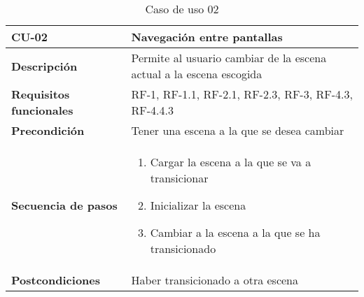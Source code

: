 \begin{longtable}{l|l}
\caption{Caso de uso 02}\\
\begin{minipage}{0.25\columnwidth}
\textbf{CU-02} 
\end{minipage}
&
\begin{minipage}{0.65\columnwidth}
Navegación entre pantallas
\end{minipage}
\\ \hline

\begin{minipage}{0.25\columnwidth}
\textbf{Descripción} 
\end{minipage}
&
\begin{minipage}{0.65\columnwidth}
Permite al usuario cambiar de la escena actual a la escena escogida
\end{minipage}
\\ \hline

\begin{minipage}{0.25\columnwidth}
\textbf{Requisitos funcionales} 
\end{minipage}
&
\begin{minipage}{0.65\columnwidth}
RF-1, RF-1.1, RF-2.1, RF-2.3, RF-3, RF-4.3, RF-4.4.3
\end{minipage}
\\ \hline

\begin{minipage}{0.25\columnwidth}
\textbf{Precondición} 
\end{minipage}
&
\begin{minipage}{0.65\columnwidth}
Tener una escena a la que se desea cambiar
\end{minipage}
\\ \hline

\begin{minipage}{0.25\columnwidth}
\textbf{Secuencia de pasos} 
\end{minipage}
&
\begin{minipage}{0.65\columnwidth}
\begin{enumerate}
\item
Cargar la escena a la que se va a transicionar
\item
Inicializar la escena
\item
Cambiar a la escena a la que se ha transicionado
\end{enumerate}
\end{minipage}
\\ \hline

\begin{minipage}{0.25\columnwidth}
\textbf{Postcondiciones} 
\end{minipage}
&
\begin{minipage}{0.65\columnwidth}
Haber transicionado a otra escena
\end{minipage}
\\ \hline


\end{longtable}
